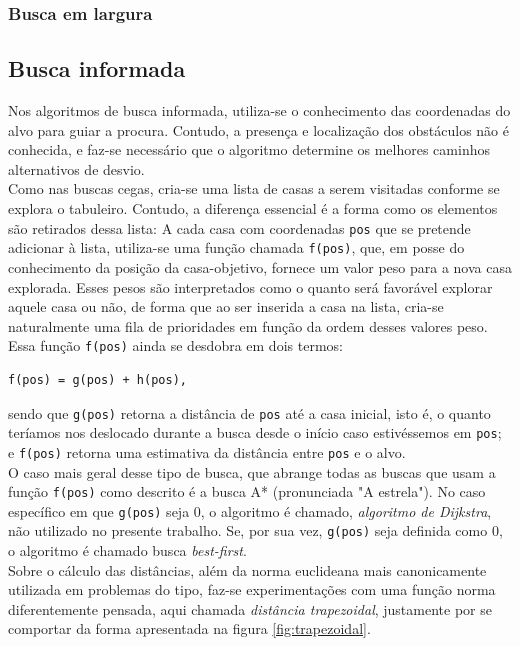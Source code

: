 \documentclass[12pt]{article}
\begin{document}
\subsubsection{Busca em largura}

\subsection{Busca informada}
Nos algoritmos de busca informada, utiliza-se o conhecimento das coordenadas do alvo para guiar a procura. Contudo, a presença e localização dos obstáculos não é conhecida, e faz-se necessário que o algoritmo determine os melhores caminhos alternativos de desvio.\\

Como nas buscas cegas, cria-se uma lista de casas a serem visitadas conforme se explora o tabuleiro. Contudo, a diferença essencial é a forma como os elementos são retirados dessa lista: A cada casa com coordenadas \verb|pos| que se pretende adicionar à lista, utiliza-se uma função chamada \verb|f(pos)|, que, em posse do conhecimento da posição da casa-objetivo, fornece um valor peso para a nova casa explorada. Esses pesos são interpretados como o quanto será favorável explorar aquele casa ou não, de forma que ao ser inserida a casa na lista, cria-se naturalmente uma fila de prioridades em função da ordem desses valores peso.\\

Essa função \verb|f(pos)| ainda se desdobra em dois termos:

\begin{verbatim}
f(pos) = g(pos) + h(pos),
\end{verbatim}

sendo que \verb|g(pos)| retorna a distância de \verb|pos| até a casa inicial, isto é, o quanto teríamos nos deslocado durante a busca desde o início caso estivéssemos em \verb|pos|; e \verb|f(pos)| retorna uma estimativa da distância entre \verb|pos| e o alvo.\\

O caso mais geral desse tipo de busca, que abrange todas as buscas que usam a função \verb|f(pos)| como descrito é a busca A* (pronunciada "A estrela"). No caso específico em que \verb|g(pos)| seja 0, o algoritmo é chamado, \emph{algoritmo de Dijkstra}, não utilizado no presente trabalho. Se, por sua vez, \verb|g(pos)| seja definida como 0, o algoritmo é chamado busca \emph{best-first}.\\

Sobre o cálculo das distâncias, além da norma euclideana mais canonicamente utilizada em problemas do tipo, faz-se experimentações com uma função norma diferentemente pensada, aqui chamada \emph{distância trapezoidal}, justamente por se comportar da forma apresentada na figura \ref{fig:trapezoidal}.
\end{document}
